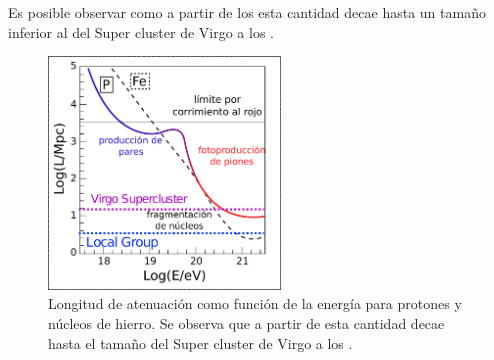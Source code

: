 Es posible observar como a partir de los  esta cantidad decae hasta un tama\~no inferior al del Super cluster de Virgo a los .
%
\begin{figure}[ht]
	\begin{center}
	\includegraphics[width=0.55\textwidth]{fig/introduccion/proton_propaga_espanol}
	\caption{\label{fig:protProp} Longitud de atenuaci\'on como funci\'on de la energ\'ia para protones y n\'ucleos de hierro. Se observa que a partir de  esta cantidad decae hasta el tama\~no del Super cluster de Virgo a los .}
	\end{center}
\end{figure}
%

